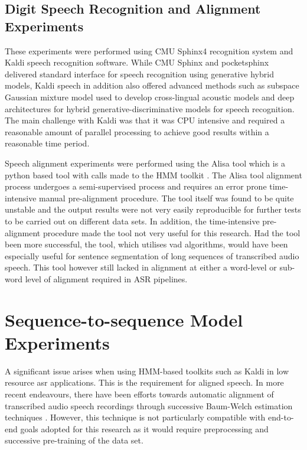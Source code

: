 \subsection{Digit Speech Recognition and Alignment Experiments}\label{sec_digitspeech}
These experiments were performed using CMU Sphinx4 recognition system and Kaldi speech recognition software.  While CMU Sphinx and pocketsphinx delivered standard interface for speech recognition using generative hybrid models, Kaldi speech in addition also offered advanced methods such as subspace Gaussian mixture model used to develop cross-lingual acoustic models and deep architectures for hybrid generative-discriminative models for speech recognition.   The main challenge with Kaldi was that it was CPU intensive and required a reasonable amount of parallel processing to achieve good results within a reasonable time period. 

Speech alignment experiments were performed using the Alisa \cite{stan2016alisa} tool which is a python based tool with calls made to the HMM toolkit \cite{young2002htk}.  The Alisa tool alignment process undergoes a semi-supervised process and requires an error prone time-intensive manual pre-alignment procedure.  The tool itself was found to be quite unstable and the output results were not very easily reproducible for further tests to be carried out on different data sets.  In addition, the time-intensive pre-alignment procedure made the tool not very useful for this research. Had the tool been more successful, the tool, which utilises \acrfull{vad} algorithms, would have been especially useful for sentence segmentation of long sequences of transcribed audio speech.  This tool however still lacked in alignment at either a word-level or sub-word level of alignment required in ASR pipelines.


\section{Sequence-to-sequence Model Experiments}\label{sec_postalign}
A significant issue arises when using HMM-based toolkits such as Kaldi in low resource \acrshort{asr} applications.  This is the requirement for aligned speech.  In more recent endeavours, there have been efforts towards automatic alignment of transcribed audio speech recordings through successive Baum-Welch estimation techniques \citep{gales2014speech,ragni2018automatic,ragni2014data}. However, this technique is not particularly compatible with end-to-end goals adopted for this research as it would require preprocessing and successive pre-training of the data set.


